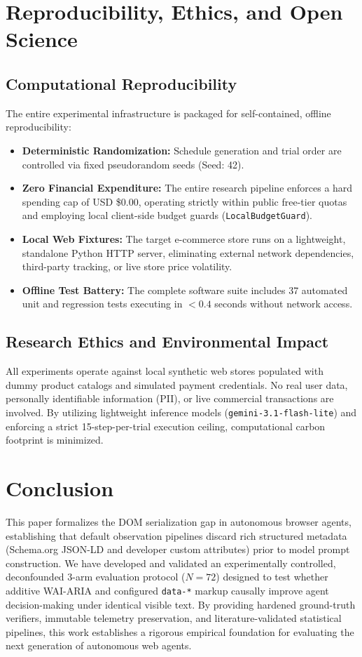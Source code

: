 \documentclass[11pt,a4paper]{article}
\begin{document}
\section{Reproducibility, Ethics, and Open Science}
\label{sec:reproducibility}

\subsection{Computational Reproducibility}
The entire experimental infrastructure is packaged for self-contained, offline reproducibility:
\begin{itemize}
    \item \textbf{Deterministic Randomization:} Schedule generation and trial order are controlled via fixed pseudorandom seeds (Seed: 42).
    \item \textbf{Zero Financial Expenditure:} The entire research pipeline enforces a hard spending cap of USD \$0.00, operating strictly within public free-tier quotas and employing local client-side budget guards (\texttt{LocalBudgetGuard}).
    \item \textbf{Local Web Fixtures:} The target e-commerce store runs on a lightweight, standalone Python HTTP server, eliminating external network dependencies, third-party tracking, or live store price volatility.
    \item \textbf{Offline Test Battery:} The complete software suite includes 37 automated unit and regression tests executing in $<0.4$ seconds without network access.
\end{itemize}

\subsection{Research Ethics and Environmental Impact}
All experiments operate against local synthetic web stores populated with dummy product catalogs and simulated payment credentials. No real user data, personally identifiable information (PII), or live commercial transactions are involved. By utilizing lightweight inference models (\texttt{gemini-3.1-flash-lite}) and enforcing a strict 15-step-per-trial execution ceiling, computational carbon footprint is minimized.

\section{Conclusion}
\label{sec:conclusion}

This paper formalizes the DOM serialization gap in autonomous browser agents, establishing that default observation pipelines discard rich structured metadata (Schema.org JSON-LD and developer custom attributes) prior to model prompt construction. We have developed and validated an experimentally controlled, deconfounded 3-arm evaluation protocol ($N=72$) designed to test whether additive WAI-ARIA and configured \texttt{data-*} markup causally improve agent decision-making under identical visible text. By providing hardened ground-truth verifiers, immutable telemetry preservation, and literature-validated statistical pipelines, this work establishes a rigorous empirical foundation for evaluating the next generation of autonomous web agents.



\end{document}
